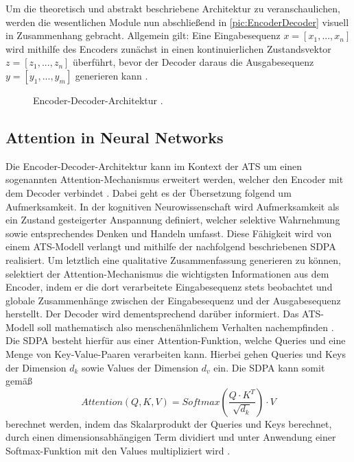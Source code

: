 \noindent
Um die theoretisch und abstrakt beschriebene Architektur zu veranschaulichen, werden die wesentlichen Module nun abschließend in \autoref{pic:EncoderDecoder} visuell in Zusammenhang gebracht. Allgemein gilt: Eine Eingabesequenz $x = [x_{1}, ..., x_{n}]$ wird mithilfe des Encoders zunächst in einen kontinuierlichen Zustandsvektor $z = [z_{1}, ..., z_{n}]$ überführt, bevor der Decoder daraus die Ausgabesequenz $y = [y_{1}, ..., y_{m}]$ generieren kann \cite[S.~2]{VAS17}.\\

\begin{figure}[h!]
  \centering
  \caption{Encoder-Decoder-Architektur \cite[S.~375]{ZHA20}.}
  \label{pic:EncoderDecoder}
\end{figure}
\newpage


\subsection{Attention in Neural Networks}
\noindent
Die Encoder-Decoder-Architektur kann im Kontext der \ac{ATS} um einen sogenannten Attention-Mechanismus erweitert werden, welcher den Encoder mit dem Decoder verbindet \cite[S.~1]{VAS17}. Dabei geht es der Übersetzung folgend um Aufmerksamkeit. In der kognitiven Neurowissenschaft wird Aufmerksamkeit als ein Zustand gesteigerter Anspannung definiert, welcher selektive Wahrnehmung sowie entsprechendes Denken und Handeln umfasst. Diese Fähigkeit wird von einem \ac{ATS}-Modell verlangt und mithilfe der nachfolgend beschriebenen \ac{SDPA} realisiert. Um letztlich eine qualitative Zusammenfassung generieren zu können, selektiert der Attention-Mechanismus die wichtigsten Informationen aus dem Encoder, indem er die dort verarbeitete Eingabesequenz stets beobachtet und globale Zusammenhänge zwischen der Eingabesequenz und der Ausgabesequenz herstellt. Der Decoder wird dementsprechend darüber informiert. Das \ac{ATS}-Modell soll mathematisch also menschenähnlichem Verhalten nachempfinden \cite[S.~389]{ZHA20}.\\

\noindent
Die \ac{SDPA} besteht hierfür aus einer Attention-Funktion, welche Queries und eine Menge von Key-Value-Paaren verarbeiten kann. Hierbei gehen Queries und Keys der Dimension $d_k$ sowie Values der Dimension $d_v$ ein. Die \ac{SDPA} kann somit gemäß $$Attention(Q, K, V) = Softmax(\frac{Q \cdot K^T}{\sqrt{d_k}}) \cdot V$$ berechnet werden, indem das Skalarprodukt der Queries und Keys berechnet, durch einen dimensionsabhängigen Term dividiert und unter Anwendung einer Softmax-Funktion mit den Values multipliziert wird \cite[S.~4]{VAS17}.\\


